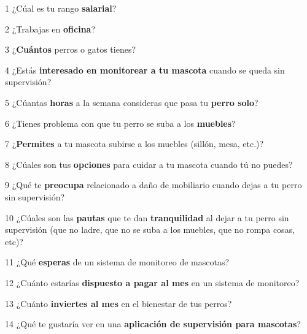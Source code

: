 \begin{landscape}
\begin{ThreePartTable}
\tiny
\begin{TableNotes}
\footnotesize
  \item[1] ¿Cúal es tu rango \textbf{salarial}?
  \item[2] ¿Trabajas en \textbf{oficina}?
  \item[3] ¿\textbf{Cuántos} perros o gatos tienes?
  \item[4] ¿Estás \textbf{interesado en monitorear a tu mascota} cuando se queda sin supervisión?
  \item[5] ¿Cúantas \textbf{horas} a la semana consideras que pasa tu \textbf{perro solo}?
  \item[6] ¿Tienes problema con que tu perro se suba a los \textbf{muebles}?
  \item[7] ¿\textbf{Permites} a tu mascota subirse a los muebles (sillón, mesa, etc.)?
  \item[8] ¿Cúales son tus \textbf{opciones} para cuidar a tu mascota cuando tú no puedes?
  \item[9] ¿Qué te \textbf{preocupa} relacionado a daño de mobiliario cuando dejas a tu perro sin supervisión?
  \item[10] ¿Cúales son las \textbf{pautas} que te dan \textbf{tranquilidad} al dejar a tu perro sin supervisión (que no ladre, que no se suba a los muebles, que no rompa cosas, etc)?
  \item[11] ¿Qué \textbf{esperas} de un sistema de monitoreo de mascotas?
  \item[12] ¿Cuánto estarías \textbf{dispuesto a pagar al mes} en un sistema de monitoreo?
  \item[13] ¿Cuánto \textbf{inviertes al mes} en el bienestar de tus perros?
  \item[14] ¿Qué te gustaría ver en una \textbf{aplicación de supervisión para mascotas}?
\end{TableNotes}
\begin{longtable}{
  p{0.052\lanscapetablewidth}
  p{0.019\lanscapetablewidth}
  p{0.050\lanscapetablewidth}
  p{0.020\lanscapetablewidth}
  p{0.027\lanscapetablewidth}
  p{0.020\lanscapetablewidth}
  p{0.031\lanscapetablewidth}
  p{0.031\lanscapetablewidth}
  p{0.031\lanscapetablewidth}
  p{0.081\lanscapetablewidth}
  p{0.096\lanscapetablewidth}
  p{0.111\lanscapetablewidth}
  p{0.132\lanscapetablewidth}
  p{0.028\lanscapetablewidth}
  p{0.036\lanscapetablewidth}
  p{0.182\lanscapetablewidth}
  p{0.052\lanscapetablewidth}
}

\end{longtable}
\end{ThreePartTable}
\end{landscape}
